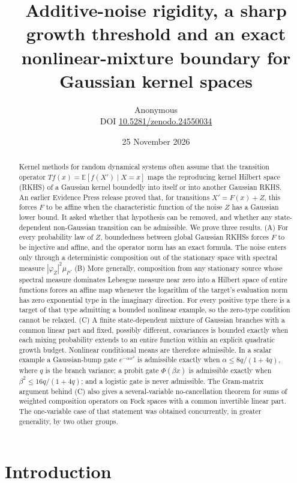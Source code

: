 \documentclass[11pt,a4paper]{article}
\title{\textbf{Additive-noise rigidity, a sharp growth threshold and an exact nonlinear-mixture boundary for Gaussian kernel spaces}}
\author{Anonymous\\[3pt]{\small DOI \href{https://doi.org/10.5281/zenodo.24550034}{10.5281/zenodo.24550034}}}
\date{25 November 2026}
\theoremstyle{remark}
\newcommand{\E}{\mathbb E}
\begin{document}
\maketitle
\begin{abstract}
Kernel methods for random dynamical systems often assume that the
transition operator $Tf(x)=\E[f(X')\mid X=x]$ maps the reproducing kernel
Hilbert space (RKHS) of a Gaussian kernel boundedly into itself or into
another Gaussian RKHS. An earlier Evidence Press release proved that, for
transitions $X'=F(x)+Z$, this forces $F$ to be affine when the
characteristic function of the noise $Z$ has a Gaussian lower bound. It
asked whether that hypothesis can be removed, and whether any
state-dependent non-Gaussian transition can be admissible. We prove three
results. (A) For every probability law of $Z$, boundedness between global
Gaussian RKHSs forces $F$ to be injective and affine, and the operator
norm has an exact formula. The noise enters only through a deterministic
composition out of the stationary space with spectral measure
$|\varphi_Z|^2\mu_P$. (B) More generally, composition from any stationary
source whose spectral measure dominates Lebesgue measure near zero into
a Hilbert space of entire
functions forces an affine map whenever the logarithm of the target's
evaluation norm has zero exponential type in the imaginary direction. For
every positive type there is a target of that type admitting a bounded
nonlinear example, so the zero-type condition cannot be relaxed. (C) A finite state-dependent mixture of Gaussian
branches with a common linear part and fixed, possibly different,
covariances is bounded exactly when each mixing probability extends to an
entire function within an explicit quadratic growth budget. Nonlinear
conditional means are therefore admissible. In a scalar example a
Gaussian-bump gate $e^{-\alpha x^2}$ is admissible exactly when
$\alpha\le 8q/(1+4q)$, where $q$ is the branch variance; a probit gate
$\Phi(\beta x)$ is admissible exactly when $\beta^2\le16q/(1+4q)$; and a
logistic gate is never admissible. The Gram-matrix argument behind (C)
also gives a several-variable no-cancellation theorem for sums of
weighted composition operators on Fock spaces with a common invertible
linear part. The one-variable case of that statement was obtained
concurrently, in greater generality, by two other groups.
\end{abstract}

\section{Introduction}\label{sec:intro}
\end{document}
